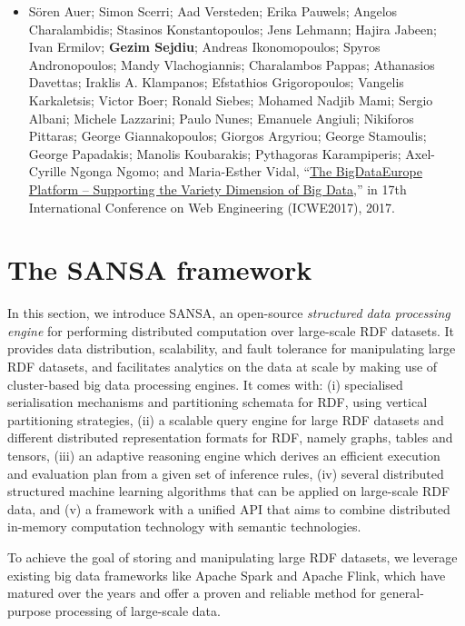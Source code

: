 \begin{itemize}
    \item Sören Auer; Simon Scerri; Aad Versteden; Erika Pauwels; Angelos Charalambidis; Stasinos Konstantopoulos; Jens Lehmann; Hajira Jabeen; Ivan Ermilov; \textbf{Gezim Sejdiu}; Andreas Ikonomopoulos; Spyros Andronopoulos; Mandy Vlachogiannis; Charalambos Pappas; Athanasios Davettas; Iraklis A. Klampanos; Efstathios Grigoropoulos; Vangelis Karkaletsis; Victor Boer; Ronald Siebes; Mohamed Nadjib Mami; Sergio Albani; Michele Lazzarini; Paulo Nunes; Emanuele Angiuli; Nikiforos Pittaras; George Giannakopoulos; Giorgos Argyriou; George Stamoulis; George Papadakis; Manolis Koubarakis; Pythagoras Karampiperis; Axel-Cyrille Ngonga Ngomo; and Maria-Esther Vidal, “\href{http://jens-lehmann.org/files/2017/icwe_bde.pdf}{The BigDataEurope Platform – Supporting the Variety Dimension of Big Data},” in 17th International Conference on Web Engineering (ICWE2017), 2017.
    
\end{itemize}


\section{The SANSA framework}
\label{sec:the-sansa-framework}
In this section, we introduce SANSA, an open-source \emph{structured data processing engine} for performing distributed computation over large-scale RDF datasets.
It provides data distribution, scalability, and fault tolerance for manipulating large RDF datasets, and facilitates analytics on the data at scale by making use of cluster-based big data processing engines.
It comes with: (i) specialised serialisation mechanisms and partitioning schemata for RDF, using vertical partitioning strategies,
(ii) a scalable query engine for large RDF datasets and different distributed representation formats for RDF, namely graphs, tables and tensors,
(iii) an adaptive reasoning engine which derives an efficient execution and evaluation plan from a given set of inference rules,
(iv) several distributed structured machine learning algorithms that can be applied on large-scale RDF data,
and (v) a framework with a unified API that aims to combine distributed in-memory computation technology with semantic technologies.

To achieve the goal of storing and manipulating large RDF datasets, we leverage existing big data frameworks like Apache Spark and Apache Flink, which have matured over the years and offer a proven and reliable method for general-purpose processing of large-scale data.


